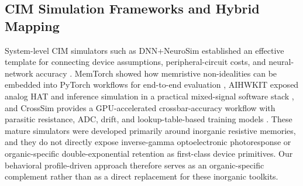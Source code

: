 \subsection{CIM Simulation Frameworks and Hybrid Mapping}
\label{subsec:cim-frameworks-mapping}

System-level CIM simulators such as DNN+NeuroSim established an effective template for connecting device assumptions, peripheral-circuit costs, and neural-network accuracy \citep{peng2020dnnneurosim}. MemTorch showed how memristive non-idealities can be embedded into PyTorch workflows for end-to-end evaluation \citep{lammie2022memtorch}, AIHWKIT exposed analog HAT and inference simulation in a practical mixed-signal software stack \citep{rasch2021aihwkit}, and CrossSim provides a GPU-accelerated crossbar-accuracy workflow with parasitic resistance, ADC, drift, and lookup-table-based training models \citep{crosssim2024}. These mature simulators were developed primarily around inorganic resistive memories, and they do not directly expose inverse-gamma optoelectronic photoresponse or organic-specific double-exponential retention as first-class device primitives. Our behavioral profile-driven approach therefore serves as an organic-specific complement rather than as a direct replacement for these inorganic toolkits.

